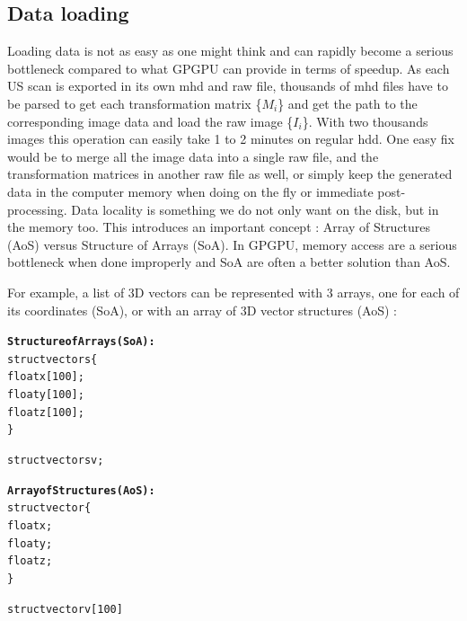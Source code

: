 \documentclass[12pt,journal,compsoc]{IEEEtran}
\begin{document}
\newpage
\subsection{Data loading}

Loading data is not as easy as one might think and can rapidly become a serious bottleneck compared to what GPGPU can provide in terms of speedup. 
As each US scan is exported in its own mhd and raw file, thousands of mhd files have to be parsed to get each transformation matrix \{$M_i$\} and get the path to the corresponding image data and load the raw image \{$I_i$\}.  
With two thousands images this operation can easily take 1 to 2 minutes on regular \ac{hdd}.
One easy fix would be to merge all the image data into a single raw file, and the transformation matrices in another raw file as well, or simply keep the generated data in the computer memory when doing on the fly or immediate post-processing.
Data locality is something we do not only want on the disk, but in the memory too. This introduces an important concept : Array of Structures (AoS) versus Structure of Arrays (SoA). In GPGPU, memory access are a serious bottleneck when done improperly and SoA are often a better solution than AoS. 

For example, a list of 3D vectors can be represented with 3 arrays, one for each of its coordinates (SoA), or with an array of 3D vector structures (AoS) :

\begin{samepage}
\begin{alltt}
\textbf{Structure of Arrays (SoA):}
struct vectors \{
    float x[100];
    float y[100];
    float z[100];
\}

struct vectors v;

\textbf{Array of Structures (AoS):}
struct vector \{
    float x;
    float y;
    float z;
\}

struct vector v[100]
\end{alltt}
\end{samepage}
\end{document}

